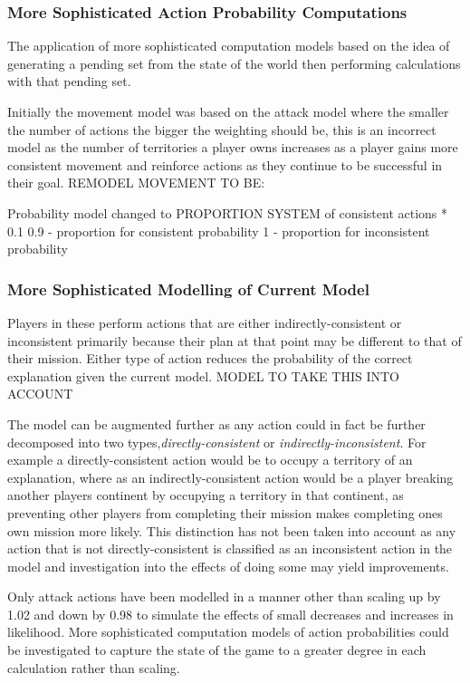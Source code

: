 \documentclass[parskip]{cs4rep}
\begin{document}
\subsubsection{More Sophisticated Action Probability Computations}

The application of more sophisticated computation models based on the idea of generating a pending set from the state of the world then performing calculations with that pending set.

Initially the movement model was based on the attack model where the smaller the number of actions the bigger the weighting should be, this is an incorrect model as the number of territories a player owns increases as a player gains more consistent movement and reinforce actions as they continue to be successful in their goal. REMODEL MOVEMENT TO BE:

Probability model changed to PROPORTION SYSTEM of consistent actions * 0.1 
0.9 - proportion for consistent probability
1 - proportion for inconsistent probability

\subsubsection{More Sophisticated Modelling of Current Model}

Players in these perform actions that are either indirectly-consistent or inconsistent  primarily because their plan at that point may be different to that of their mission. Either type of action reduces the probability of the correct explanation given the current model. MODEL TO TAKE THIS INTO ACCOUNT

The model can be augmented further as any action could in fact be further decomposed into two types,\textit{directly-consistent} or \textit{indirectly-inconsistent}. For example a directly-consistent action would be to occupy a territory of an explanation, where as an indirectly-consistent action would be a player breaking another players continent by occupying a territory in that continent, as preventing other players from completing their mission makes completing ones own mission more likely. This distinction has not been taken into account as any action that is not directly-consistent is classified as an inconsistent action in the model and investigation into the effects of doing some may yield improvements.

Only attack actions have been modelled in a manner other than scaling up by 1.02 and down by 0.98 to simulate the effects of small decreases and increases in likelihood. More sophisticated computation models of action probabilities could be investigated to capture the state of the game to a greater degree in each calculation rather than scaling.
\end{document}

